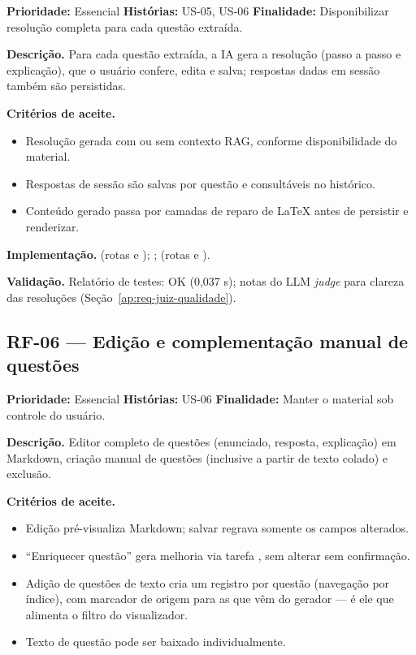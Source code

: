 \textbf{Prioridade:} Essencial \quad \textbf{Histórias:} US-05, US-06 \quad \textbf{Finalidade:} Disponibilizar resolução completa para cada questão extraída.

\textbf{Descrição.} Para cada questão extraída, a IA gera a resolução (passo a passo e explicação), que o usuário confere, edita e salva; respostas dadas em sessão também são persistidas.

\textbf{Critérios de aceite.}
\begin{itemize}
    \item Resolução gerada com ou sem contexto RAG, conforme disponibilidade do material.
    \item Respostas de sessão são salvas por questão e consultáveis no histórico.
    \item Conteúdo gerado passa por camadas de reparo de LaTeX antes de persistir e renderizar.
\end{itemize}

\textbf{Implementação.}  (rotas \texttt{} e \texttt{}); ;  (rotas \texttt{} e \texttt{}).

\textbf{Validação.} Relatório de testes: \texttt{} OK (0,037 s); notas do LLM \emph{judge} para clareza das resoluções (Seção~\ref{ap:req-juiz-qualidade}).

\subsection{RF-06 --- Edição e complementação manual de questões}

\textbf{Prioridade:} Essencial \quad \textbf{Histórias:} US-06 \quad \textbf{Finalidade:} Manter o material sob controle do usuário.

\textbf{Descrição.} Editor completo de questões (enunciado, resposta, explicação) em Markdown, criação manual de questões (inclusive a partir de texto colado) e exclusão.

\textbf{Critérios de aceite.}
\begin{itemize}
    \item Edição pré-visualiza Markdown; salvar regrava somente os campos alterados.
    \item ``Enriquecer questão'' gera melhoria via tarefa \texttt{}, sem alterar sem confirmação.
    \item Adição de questões de texto cria um registro por questão (navegação por índice), com marcador de origem para as que vêm do gerador — é ele que alimenta o filtro do visualizador.
    \item Texto de questão pode ser baixado individualmente.
\end{itemize}

